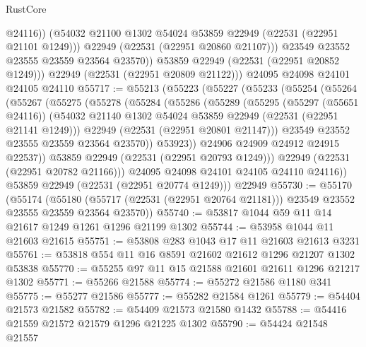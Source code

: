 \begin{lexlean}{RustCore}
\begin{coremodule}
                  @24116))
              (@54032 @21100 @1302 @54024 @53859 @22949 (@22531 (@22951 @21101 @1249)))
              @22949
              (@22531 (@22951 @20860 @21107)))
            @23549
            @23552
            @23555
            @23559
            @23564
            @23570))
        @53859
        @22949
        (@22531 (@22951 @20852 @1249)))
      @22949
      (@22531 (@22951 @20809 @21122)))
    @24095
    @24098
    @24101
    @24105
    @24110
@55717 := @55213
    (@55223
      (@55227
        (@55233
          (@55254
            (@55264
              (@55267
                (@55275
                  (@55278
                    (@55284
                      (@55286
                        (@55289
                          (@55295
                            (@55297 (@55651 @24116))
                            (@54032
                              @21140
                              @1302
                              @54024
                              @53859
                              @22949
                              (@22531 (@22951 @21141 @1249)))
                            @22949
                            (@22531 (@22951 @20801 @21147)))
                          @23549
                          @23552
                          @23555
                          @23559
                          @23564
                          @23570))
                      @53923))
                  @24906
                  @24909
                  @24912
                  @24915
                  @22537))
              @53859
              @22949
              (@22531 (@22951 @20793 @1249)))
            @22949
            (@22531 (@22951 @20782 @21166)))
          @24095
          @24098
          @24101
          @24105
          @24110
          @24116))
      @53859
      @22949
      (@22531 (@22951 @20774 @1249)))
    @22949
@55730 := @55170
    (@55174
      (@55180 (@55717 (@22531 (@22951 @20764 @21181))) @23549 @23552 @23555 @23559 @23564 @23570))
@55740 := @53817 @1044 @59 @11 @14 @21617 @1249 @1261 @1296 @21199 @1302
@55744 := @53958 @1044 @11 @21603 @21615
@55751 := @53808 @283 @1043 @17 @11 @21603 @21613 @3231
@55761 := @53818 @554 @11 @16 @8591 @21602 @21612 @1296 @21207 @1302 @53838
@55770 := @55255 @97 @11 @15 @21588 @21601 @21611 @1296 @21217 @1302
@55771 := @55266 @21588
@55774 := @55272 @21586 @1180 @341
@55775 := @55277 @21586
@55777 := @55282 @21584 @1261
@55779 := @54404 @21573 @21582
@55782 := @54409 @21573 @21580 @1432
@55788 := @54416 @21559 @21572 @21579 @1296 @21225 @1302
@55790 := @54424 @21548 @21557

\end{coremodule}
\end{lexlean}

